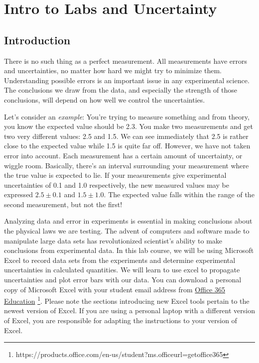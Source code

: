 \newcommand{\comment}[1]{}
\chapter{Intro to Labs and Uncertainty}
\label{chap:excel}
\section{Introduction}

There is no such thing as a perfect measurement. All measurements have errors and uncertainties, no matter how hard we might try to minimize them. Understanding possible errors is an important issue in any experimental science. The conclusions we draw from the data, and especially the strength of those conclusions, will depend on how well we control the uncertainties. \myskip

Let's consider an \emph{example}: You're trying to measure something and from theory, you know the expected value should be 2.3. You make two measurements and get two very different values: 2.5 and 1.5. We can see immediately that 2.5 is rather close to the expected value while 1.5 is quite far off. However, we have not taken error into account. Each measurement has a certain amount of uncertainty, or wiggle room. Basically, there's an interval surrounding your measurement where the true value is expected to lie. If your measurements give experimental uncertainties of 0.1 and 1.0 respectively, the new measured values may be expressed $2.5\pm 0.1$ and $1.5\pm 1.0$. The expected value falls within the range of the second measurement, but not the first! \myskip

Analyzing data and error in experiments is essential in making conclusions about the physical laws we are testing. The advent of computers and software made to manipulate large data sets has revolutionized scientist's ability to make conclusions from experimental data. In this lab course, we will be using Microsoft Excel to record data sets from the experiments and determine experimental uncertainties in calculated quantities. We will learn to use excel to propagate uncertainties and plot error bars with our data. You can download a personal copy of Microsoft Excel with your student email address from
\href{https://products.office.com/en-us/student?ms.officeurl=getoffice365}{Office 365 Education} \footnote{https://products.office.com/en-us/student?ms.officeurl=getoffice365}. Please note the sections introducing new Excel tools pertain to the newest version of Excel. If you are using a personal laptop with a different version of Excel, you are responsible for adapting the instructions to your version of Excel. \myskip

